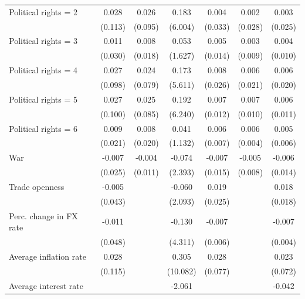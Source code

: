 \begin{table}[htbp]
\begin{tabular}{lcccccc}
      Political rights = 2       & 0.028    & 0.026    & 0.183     & 0.004    & 0.002    & 0.003\\   
                                 & (0.113)  & (0.095)  & (6.004)   & (0.033)  & (0.028)  & (0.025)\\   
      Political rights = 3       & 0.011    & 0.008    & 0.053     & 0.005    & 0.003    & 0.004\\   
                                 & (0.030)  & (0.018)  & (1.627)   & (0.014)  & (0.009)  & (0.010)\\   
      Political rights = 4       & 0.027    & 0.024    & 0.173     & 0.008    & 0.006    & 0.006\\   
                                 & (0.098)  & (0.079)  & (5.611)   & (0.026)  & (0.021)  & (0.020)\\   
      Political rights = 5       & 0.027    & 0.025    & 0.192     & 0.007    & 0.007    & 0.006\\   
                                 & (0.100)  & (0.085)  & (6.240)   & (0.012)  & (0.010)  & (0.011)\\   
      Political rights = 6       & 0.009    & 0.008    & 0.041     & 0.006    & 0.006    & 0.005\\   
                                 & (0.021)  & (0.020)  & (1.132)   & (0.007)  & (0.004)  & (0.006)\\   
      War                        & -0.007   & -0.004   & -0.074    & -0.007   & -0.005   & -0.006\\   
                                 & (0.025)  & (0.011)  & (2.393)   & (0.015)  & (0.008)  & (0.014)\\   
      Trade openness             & -0.005   &          & -0.060    & 0.019    &          & 0.018\\   
                                 & (0.043)  &          & (2.093)   & (0.025)  &          & (0.018)\\   
      Perc. change in FX rate    & -0.011   &          & -0.130    & -0.007   &          & -0.007\\   
                                 & (0.048)  &          & (4.311)   & (0.006)  &          & (0.004)\\   
      Average inflation rate     & 0.028    &          & 0.305     & 0.028    &          & 0.023\\   
                                 & (0.115)  &          & (10.082)  & (0.077)  &          & (0.072)\\   
      Average interest rate      &          &          & -2.061    &          &          & -0.042\\   

\end{tabular}
\end{table}
